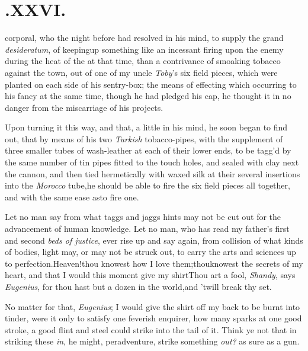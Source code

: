 \documentclass{article}
\begin{document}
\section{.\enspace XXVI.}

 corporal, who the night before
had resolved in his mind, to\break
supply the grand \textit{desideratum}, of keeping\break up something like an incessant
firing upon the enemy during the heat of the  at that time, than a contrivance of smoaking tobacco against the town, out of
one of my uncle \textit{Toby}’s six field pieces, which were planted on each side of
his\break
sentry-box; the means of effecting which\break
occurring to his fancy at the same time,\break
though he had pledged his cap, he thought it in no danger from the miscarriage
of his projects.

Upon turning it this way, and that, a little in his mind, he
soon began to find out, that by means of his two \textit{Tur\-kish}
tobacco-pipes, with the supplement of three smaller tubes of
wash-leather at each of their lower ends, to be tagg’d by the
same number of tin pipes fitted to the touch holes, and sealed with
clay next the cannon, and then tied herme\-tically with waxed silk at
their several insertions into the \textit{Morocco} tube,\tsk he
should be able to fire the six field pieces all together, and with
the same ease as\break to fire one.\tsh 

\enlargethispage{2\baselineskip}
\tsh Let no man say from what taggs and jaggs hints may
not be cut out for the advancement of human knowledge. Let no man, who
has read my father’s first and second \textit{beds of justice},
ever rise up and say again, from collision of what kinds of bodies,
light may, or may not be struck out, to carry the arts and sciences
up to perfection.\tsh Heaven!\break thou knowest how I love
them;\tsk thou\break knowest the secrets of my heart, and that I
would this moment give my shirt\break\tsh Thou art a fool,
\textit{Shandy}, says \textit{Eu\-genius}, for thou hast but a dozen in
the world,\tsk and ’twill break thy set.\tsh

No matter for that, \textit{Eugenius}; I would give the shirt off
my back to be burnt into tinder, were it only to satisfy one
feverish enquirer, how many sparks at one good stroke, a good flint
and steel could strike into the tail of it.\tsh\break
Think ye not that in striking these \textit{in},\tsk\break
he might, peradventure, strike something \textit{out?} as sure as a
gun.\tsh
\end{document}
